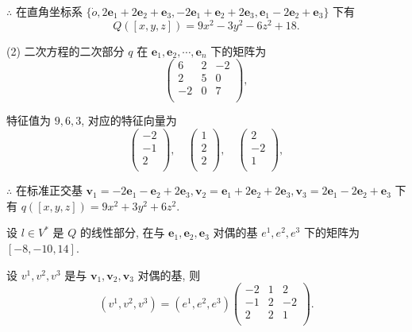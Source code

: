 \documentclass{ctexart}
\begin{document}
\begin{solution}
    $\therefore$ 在直角坐标系 $\{\dot{o},2\boldsymbol{e}_1+2\boldsymbol{e}_2+\boldsymbol{e}_3,-2\boldsymbol{e}_1+\boldsymbol{e}_2+2\boldsymbol{e}_3,\boldsymbol{e}_1-2\boldsymbol{e}_2+\boldsymbol{e}_3\}$ 下有
    \[Q([x,y,z])=9x^2-3y^2-6z^2+18.\]

    (2) 二次方程的二次部分 $q$ 在 $\boldsymbol{e}_1,\boldsymbol{e}_2,\cdots,\boldsymbol{e}_n$ 下的矩阵为
    \[\begin{pmatrix}
        6 & 2 & -2 \\
        2 & 5 & 0 \\
        -2 & 0 & 7 \\
    \end{pmatrix},\]

    特征值为 $9,6,3$, 对应的特征向量为
    \[\begin{pmatrix}
        -2 \\
        -1 \\
        2 \\
    \end{pmatrix},\quad\begin{pmatrix}
        1 \\
        2 \\
        2 \\
    \end{pmatrix},\quad\begin{pmatrix}
        2 \\
        -2 \\
        1 \\
    \end{pmatrix},\]

    $\therefore$ 在标准正交基 $\boldsymbol{v}_1=-2\boldsymbol{e}_1-\boldsymbol{e}_2+2\boldsymbol{e}_3,\boldsymbol{v}_2=\boldsymbol{e}_1+2\boldsymbol{e}_2+2\boldsymbol{e}_3,\boldsymbol{v}_3=2\boldsymbol{e}_1-2\boldsymbol{e}_2+\boldsymbol{e}_3$ 下有 $q([x,y,z])=9x^2+3y^2+6z^2$.

    设 $l\in V^*$ 是 $Q$ 的线性部分, 在与 $\boldsymbol{e}_1,\boldsymbol{e}_2,\boldsymbol{e}_3$ 对偶的基 $e^1,e^2,e^3$ 下的矩阵为 $[-8,-10,14]$.

    设 $v^1,v^2,v^3$ 是与 $\boldsymbol{v}_1,\boldsymbol{v}_2,\boldsymbol{v}_3$ 对偶的基, 则
    \[(v^1,v^2,v^3)=(e^1,e^2,e^3)\begin{pmatrix}
        -2 & 1 & 2  \\
        -1 & 2 & -2 \\
        2  & 2 & 1  \\
    \end{pmatrix}.\]


\end{solution}
\end{document}
